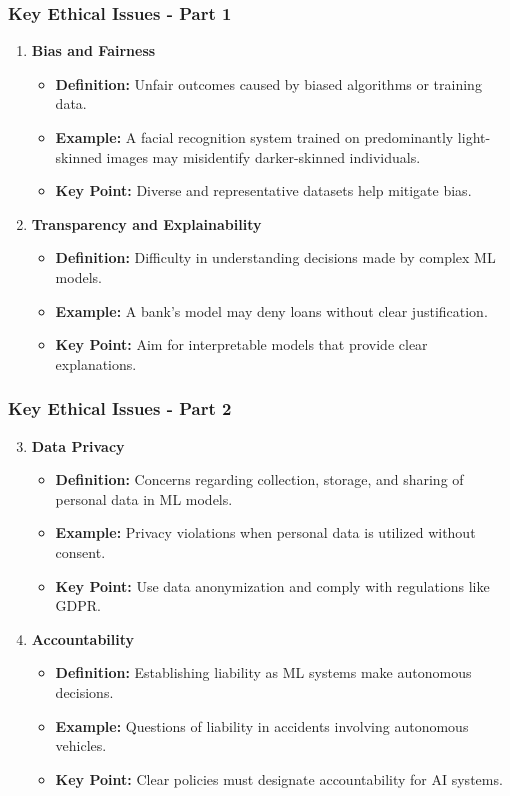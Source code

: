 \documentclass[aspectratio=169]{beamer}
\begin{document}
\begin{frame}[fragile]
    \frametitle{Key Ethical Issues - Part 1}
    \begin{enumerate}
        \item \textbf{Bias and Fairness}
        \begin{itemize}
            \item \textbf{Definition:} Unfair outcomes caused by biased algorithms or training data.
            \item \textbf{Example:} A facial recognition system trained on predominantly light-skinned images may misidentify darker-skinned individuals.
            \item \textbf{Key Point:} Diverse and representative datasets help mitigate bias.
        \end{itemize}

        \item \textbf{Transparency and Explainability}
        \begin{itemize}
            \item \textbf{Definition:} Difficulty in understanding decisions made by complex ML models.
            \item \textbf{Example:} A bank's model may deny loans without clear justification.
            \item \textbf{Key Point:} Aim for interpretable models that provide clear explanations.
        \end{itemize}
    \end{enumerate}
\end{frame}

\begin{frame}[fragile]
    \frametitle{Key Ethical Issues - Part 2}
    \begin{enumerate}
        \setcounter{enumi}{2}
        \item \textbf{Data Privacy}
        \begin{itemize}
            \item \textbf{Definition:} Concerns regarding collection, storage, and sharing of personal data in ML models.
            \item \textbf{Example:} Privacy violations when personal data is utilized without consent.
            \item \textbf{Key Point:} Use data anonymization and comply with regulations like GDPR.
        \end{itemize}

        \item \textbf{Accountability}
        \begin{itemize}
            \item \textbf{Definition:} Establishing liability as ML systems make autonomous decisions.
            \item \textbf{Example:} Questions of liability in accidents involving autonomous vehicles.
            \item \textbf{Key Point:} Clear policies must designate accountability for AI systems.
        \end{itemize}
    \end{enumerate}
\end{frame}
\end{document}

